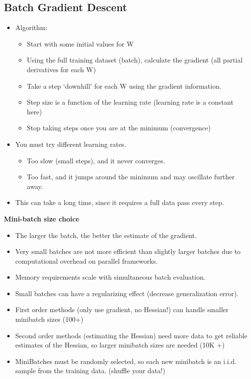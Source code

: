 \documentclass[fontset=fandol,zihao=false,scheme=chinese,heading=true,UTF8]{ctexbook}
\providecommand{\tightlist}{%
  \setlength{\itemsep}{0pt}\setlength{\parskip}{0pt}}
\begin{document}
\hypertarget{batch-gradient-descent}{%
\subsection{Batch Gradient Descent}\label{batch-gradient-descent}}

\begin{itemize}
\tightlist
\item
  Algorithm:

  \begin{itemize}
  \tightlist
  \item
    Start with some initial values for W
  \item
    Using the full training dataset (batch), calculate the gradient (all partial derivatives for each W)
  \item
    Take a step `downhill' for each W using the gradient information.
  \item
    Step size is a function of the learning rate (learning rate is a constant here)
  \item
    Stop taking steps once you are at the minimum (convergence)
  \end{itemize}
\item
  You must try different learning rates.

  \begin{itemize}
  \tightlist
  \item
    Too slow (small steps), and it never converges.
  \item
    Too fast, and it jumps around the minimum and may oscillate further away.
  \end{itemize}
\item
  This can take a long time, since it requires a full data pass every step.
\end{itemize}

\textbf{Mini-batch size choice}

\begin{itemize}
\tightlist
\item
  The larger the batch, the better the estimate of the gradient.
\item
  Very small batches are not more efficient than slightly larger batches due to computational overhead on parallel frameworks.
\item
  Memory requirements scale with simultaneous batch evaluation.
\item
  Small batches can have a regularizing effect (decrease generalization error).
\item
  First order methods (only use gradient, no Hessian!) can handle smaller minibatch sizes (100+)
\item
  Second order methods (estimating the Hessian) need more data to get reliable estimates of the Hessian, so larger minibatch sizes are needed (10K +)
\item
  MiniBatches must be randomly selected, so each new minibatch is an i.i.d. sample from the training data. (shuffle your data!)
\end{itemize}
\end{document}
